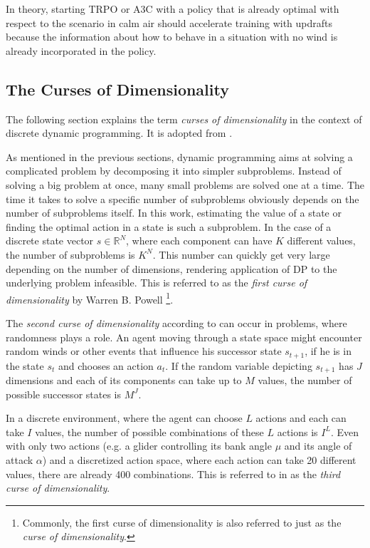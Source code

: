 In theory, starting TRPO or A3C with a policy that is already optimal with respect to the scenario in calm air should accelerate training with updrafts because the information about how to behave in a situation with no wind is already incorporated in the policy.

\subsection{The Curses of Dimensionality}
\label{sec:curses}
The following section explains the term \textit{curses of dimensionality} in the context of discrete dynamic programming. It is adopted from \cite[section~1.2]{Powell2007ADP}.\smallbreak

As mentioned in the previous sections, dynamic programming aims at solving a complicated problem by decomposing it into simpler subproblems. Instead of solving a big problem at once, many small problems are solved one at a time. The time it takes to solve a specific number of subproblems obviously depends on the number of subproblems itself. In this work, estimating the value of a state or finding the optimal action in a state is such a subproblem. In the case of a discrete state vector $s\in\mathbb{R}^N$, where each component can have $K$ different values, the number of subproblems is $K^N$. This number can quickly get very large depending on the number of dimensions, rendering application of DP to the underlying problem infeasible. This is referred to as the  \textit{first curse of dimensionality} by Warren B. Powell \cite{Powell2007ADP}\footnote{Commonly, the first curse of dimensionality is also referred to just as the \textit{curse of dimensionality}.}.\smallbreak

The \textit{second curse of dimensionality} according to \cite{Powell2007ADP} can occur in problems, where randomness plays a role. An agent moving through a state space might encounter random winds or other events that influence his successor state $s_{t+1}$, if he is in the state $s_t$ and chooses an action $a_t$. If the random variable depicting $s_{t+1}$ has $J$ dimensions and each of its components can take up to $M$ values, the number of possible successor states is $M^J$.\smallbreak

In a discrete environment, where the agent can choose $L$ actions and each can take $I$ values, the number of possible combinations of these $L$ actions is $I^L$. Even with only two actions (e.g. a glider controlling its bank angle $\mu$ and its angle of attack $\alpha$) and a discretized action space, where each action can take 20 different values, there are already 400 combinations. This is referred to in \cite{Powell2007ADP} as the \textit{third curse of dimensionality}.\smallbreak

